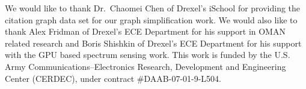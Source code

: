 \begin{acknowledgments} 
We would like to thank Dr.~Chaomei Chen of Drexel's iSchool for providing the citation graph data set for our graph simplification work.  We would also like to thank Alex Fridman of Drexel's ECE Department for his support in OMAN related research and Boris Shishkin of Drexel's ECE Department for his support with the GPU based spectrum sensing work.  This work is funded by the U.S. Army Communications--Electronics Research, Development and Engineering Center (CERDEC), under contract \#DAAB-07-01-9-L504.
\end{acknowledgments}
